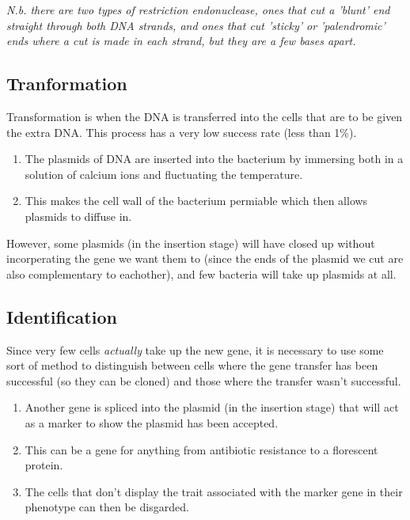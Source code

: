 \documentclass{article}
\begin{document}
\textit{N.b. there are two types of restriction endonuclease, ones that cut a
'blunt' end straight through both DNA strands, and ones that cut 'sticky' or
'palendromic' ends where a cut is made in each strand, but they are a few bases
apart.}

\subsection*{Tranformation}

Transformation is when the DNA is transferred into the cells that are to be given the extra DNA. This process has a very low success rate (less than 1\%).

\begin{enumerate}
	
	\item The plasmids of DNA are inserted into the bacterium by immersing both
	in a solution of calcium ions and fluctuating the temperature.

	\item This makes the cell wall of the bacterium permiable which then allows
	plasmids to diffuse in.

\end{enumerate}

However, some plasmids (in the insertion stage) will have closed up without
incorperating the gene we want them to (since the ends of the plasmid we cut are
also complementary to eachother), and few bacteria will take up plasmids at all.

\subsection*{Identification}

Since very few cells {\it actually} take up the new gene, it is necessary to use
some sort of method to distinguish between cells where the gene transfer has
been successful (so they can be cloned) and those where the transfer wasn't
successful.

\begin{enumerate}
	
	\item Another gene is spliced into the plasmid (in the insertion stage) that
	will act as a marker to show the plasmid has been accepted.

	\item This can be a gene for anything from antibiotic resistance to a
	florescent protein.

	\item The cells that don't display the trait associated with the marker gene
	in their phenotype can then be disgarded.

\end{enumerate}
\end{document}
